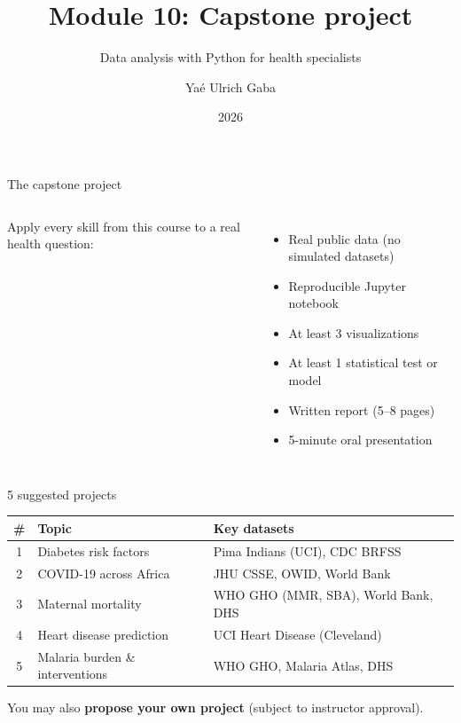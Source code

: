 \documentclass[aspectratio=169,11pt]{beamer}
\title{Module 10: Capstone project}
\subtitle{Data analysis with Python for health specialists}
\author{Yaé Ulrich Gaba}
\institute{AIRINA Labs}
\date{2026}
\begin{document}
\maketitle

\begin{frame}{The capstone project}
\begin{columns}
Apply \alert{every skill} from this course to a real health question:
\begin{itemize}
  \item Real public data (no simulated datasets)
  \item Reproducible Jupyter notebook
  \item At least 3 visualizations
  \item At least 1 statistical test or model
  \item Written report (5--8 pages)
  \item 5-minute oral presentation
\end{itemize}

\centering
{}
\end{columns}
\end{frame}

\begin{frame}{5 suggested projects}
\begin{table}
\small
\begin{tabular}{clp{6cm}}
\toprule
\textbf{\#} & \textbf{Topic} & \textbf{Key datasets} \\
\midrule
1 & Diabetes risk factors & Pima Indians (UCI), CDC BRFSS \\
2 & COVID-19 across Africa & JHU CSSE, OWID, World Bank \\
3 & Maternal mortality & WHO GHO (MMR, SBA), World Bank, DHS \\
4 & Heart disease prediction & UCI Heart Disease (Cleveland) \\
5 & Malaria burden \& interventions & WHO GHO, Malaria Atlas, DHS \\
\bottomrule
\end{tabular}
\end{table}

\vspace{6pt}
You may also \textbf{propose your own project} (subject to instructor approval).
\end{frame}
\end{document}
